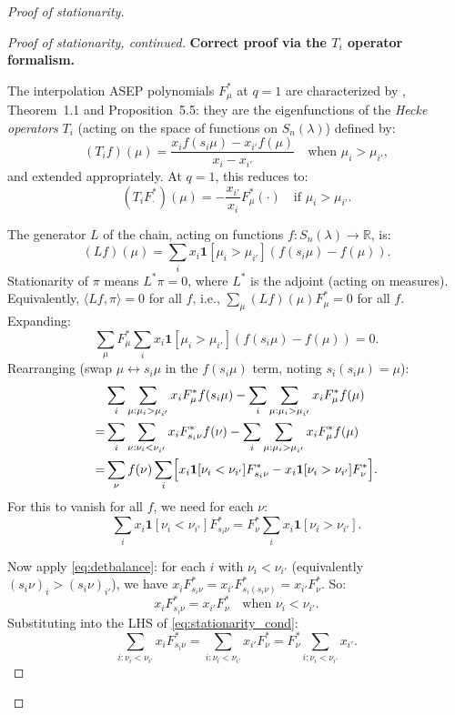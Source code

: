 \documentclass[12pt]{article}
\theoremstyle{definition}
\begin{document}
\begin{proof}[Proof of stationarity]
\begin{proof}[Proof of stationarity, continued]
\medskip

\textbf{Correct proof via the $T_i$ operator formalism.}

The interpolation ASEP polynomials $F^*_\mu$ at $q=1$ are characterized by
\cite{CMW22}, Theorem~1.1 and Proposition~5.5: they are the eigenfunctions of
the \emph{Hecke operators} $T_i$ (acting on the space of functions on
$S_n(\lambda)$) defined by:
\begin{equation}\label{eq:Toperator}
  (T_i f)(\mu) = \frac{x_i f(s_i\mu) - x_{i'} f(\mu)}{x_i - x_{i'}}
  \quad \text{when } \mu_i > \mu_{i'},
\end{equation}
and extended appropriately.  At $q=1$, this reduces to:
\begin{equation}\label{eq:Ti_action}
  (T_i F^*_\cdot)(\mu) = -\frac{x_{i'}}{x_i} F^*_\mu(\cdot)
  \quad \text{if } \mu_i > \mu_{i'}.
\end{equation}

The generator $L$ of the chain, acting on functions $f : S_n(\lambda) \to \mathbb{R}$, is:
\[
  (Lf)(\mu) = \sum_i x_i \mathbf{1}[\mu_i > \mu_{i'}] (f(s_i\mu) - f(\mu)).
\]
Stationarity of $\pi$ means $L^* \pi = 0$, where $L^*$ is the adjoint (acting
on measures).  Equivalently, $\langle Lf, \pi \rangle = 0$ for all $f$, i.e.,
$\sum_\mu (Lf)(\mu) F^*_\mu = 0$ for all $f$.  Expanding:
\[
  \sum_\mu F^*_\mu \sum_i x_i \mathbf{1}[\mu_i > \mu_{i'}](f(s_i\mu) - f(\mu)) = 0.
\]
Rearranging (swap $\mu \leftrightarrow s_i\mu$ in the $f(s_i\mu)$ term, noting
$s_i(s_i\mu) = \mu$):
\begin{align*}
  &\sum_i \sum_{\mu : \mu_i > \mu_{i'}} x_i F^*_\mu f(s_i\mu)
  - \sum_i \sum_{\mu : \mu_i > \mu_{i'}} x_i F^*_\mu f(\mu) \\
  = &\sum_i \sum_{\nu : \nu_i < \nu_{i'}} x_i F^*_{s_i\nu} f(\nu)
  - \sum_i \sum_{\mu : \mu_i > \mu_{i'}} x_i F^*_\mu f(\mu) \\
  = &\sum_\nu f(\nu) \sum_i \Bigl[
    x_i \mathbf{1}[\nu_i < \nu_{i'}] F^*_{s_i\nu}
    - x_i \mathbf{1}[\nu_i > \nu_{i'}] F^*_\nu
  \Bigr].
\end{align*}
For this to vanish for all $f$, we need for each $\nu$:
\begin{equation}\label{eq:stationarity_cond}
  \sum_i x_i \mathbf{1}[\nu_i < \nu_{i'}] F^*_{s_i\nu}
  = F^*_\nu \sum_i x_i \mathbf{1}[\nu_i > \nu_{i'}].
\end{equation}

Now apply \eqref{eq:detbalance}: for each $i$ with $\nu_i < \nu_{i'}$
(equivalently $(s_i\nu)_i > (s_i\nu)_{i'}$), we have $x_i F^*_{s_i\nu} =
x_{i'} F^*_{s_i(s_i\nu)} = x_{i'} F^*_\nu$.  So:
\[
  x_i F^*_{s_i\nu} = x_{i'} F^*_\nu \quad \text{when } \nu_i < \nu_{i'}.
\]
Substituting into the LHS of \eqref{eq:stationarity_cond}:
\[
  \sum_{i : \nu_i < \nu_{i'}} x_i F^*_{s_i\nu}
  = \sum_{i : \nu_i < \nu_{i'}} x_{i'} F^*_\nu
  = F^*_\nu \sum_{i : \nu_i < \nu_{i'}} x_{i'}.
\]


\end{proof}
\end{proof}
\end{document}
